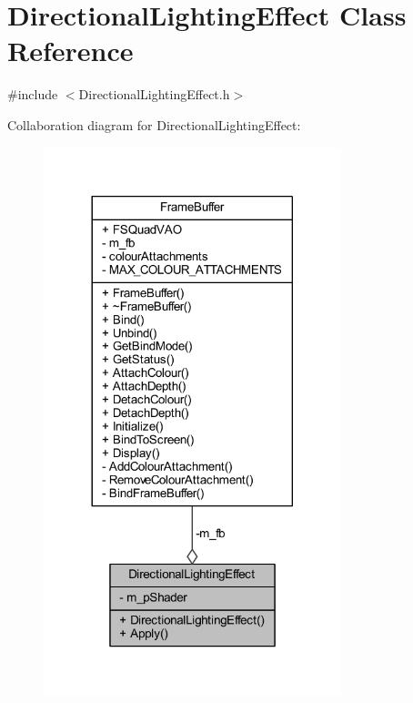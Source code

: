 \hypertarget{class_directional_lighting_effect}{}\section{Directional\+Lighting\+Effect Class Reference}
\label{class_directional_lighting_effect}


{\ttfamily \#include $<$Directional\+Lighting\+Effect.\+h$>$}



Collaboration diagram for Directional\+Lighting\+Effect\+:\nopagebreak
\begin{figure}[H]
\begin{center}
\leavevmode
\includegraphics[width=245pt]{class_directional_lighting_effect__coll__graph}
\end{center}
\end{figure}
